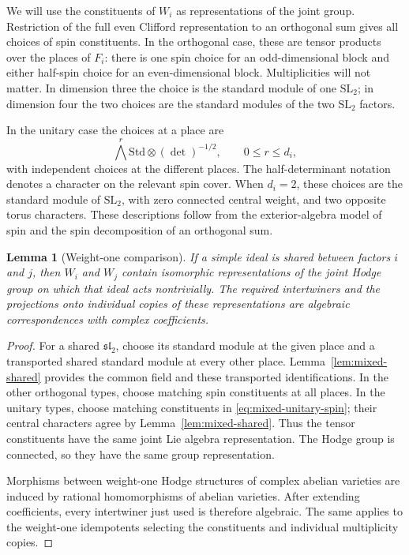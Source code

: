 \documentclass[11pt]{article}
\numberwithin{equation}{section}
\newtheorem{lemma}[theorem]{Lemma}
\theoremstyle{definition}
\theoremstyle{remark}
\begin{document}
We will use the constituents of $W_i$ as representations of the joint
group.  Restriction of the full even Clifford representation to an
orthogonal sum gives all choices of spin constituents.  In the
orthogonal case, these are tensor products over the places of $F_i$:
there is one spin choice for an odd-dimensional block and either
half-spin choice for an even-dimensional block.  Multiplicities will
not matter.  In dimension three the choice is the standard module of
one $\mathrm{SL}_2$; in dimension four the two choices are the
standard modules of the two $\mathrm{SL}_2$ factors.

In the unitary case the choices at a place are
\begin{equation}\label{eq:mixed-unitary-spin}
 \bigwedge^r\mathrm{Std}\otimes(\det)^{-1/2},
       \qquad 0\le r\le d_i,
\end{equation}
with independent choices at the different places.  The half-determinant
notation denotes a character on the relevant spin cover.  When $d_i=2$,
these choices are the standard module of $\mathrm{SL}_2$, with zero
connected central weight, and two opposite torus characters.  These
descriptions follow from the exterior-algebra model of spin and the
spin decomposition of an orthogonal sum.

\begin{lemma}[Weight-one comparison]\label{lem:mixed-constituents}
If a simple ideal is shared between factors $i$ and $j$, then $W_i$
and $W_j$ contain isomorphic representations of the joint Hodge group
on which that ideal acts nontrivially.  The required intertwiners and
the projections onto individual copies of these representations are
algebraic correspondences with complex coefficients.
\end{lemma}

\begin{proof}
For a shared $\mathfrak{sl}_2$, choose its standard module at the
given place and a transported shared standard module at every other
place.  Lemma~\ref{lem:mixed-shared} provides the common field and
these transported identifications.  In the other orthogonal types,
choose matching spin constituents at all places.  In the unitary
types, choose matching constituents in
\eqref{eq:mixed-unitary-spin}; their central characters agree by
Lemma~\ref{lem:mixed-shared}.  Thus the tensor constituents have the
same joint Lie algebra representation.  The Hodge group is connected,
so they have the same group representation.

Morphisms between weight-one Hodge structures of complex abelian
varieties are induced by rational homomorphisms of abelian varieties.
After extending coefficients, every intertwiner just used is therefore
algebraic.  The same applies to the weight-one idempotents selecting
the constituents and individual multiplicity copies.
\end{proof}
\end{document}
